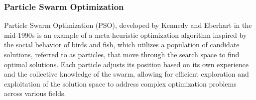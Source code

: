 \documentclass{article}[11pt]
\begin{document}


\subsubsection*{Particle Swarm Optimization}
Particle Swarm Optimization (PSO), developed by Kennedy and Eberhart in the mid-1990s \cite{PSO1995} is an example of a meta-heuristic optimization algorithm inspired by the social behavior of birds and fish, which utilizes a population of candidate solutions, referred to as particles, that move through the search space to find optimal solutions. 
Each particle adjusts its position based on its own experience and the collective knowledge of the swarm, allowing for efficient exploration and exploitation of the solution space to address complex optimization problems across various fields.
\end{document}
